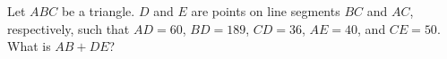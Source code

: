 Let $ABC$ be a triangle. $D$ and $E$ are points on line segments $BC$ and $AC$, respectively, such that $AD=60$, $BD=189$, $CD=36$, $AE=40$, and $CE=50$. What is $AB+DE$?
